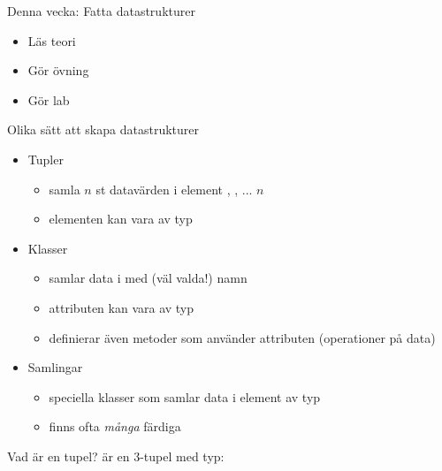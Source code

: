 
\ifkompendium\else

\begin{Slide}{Denna vecka: Fatta datastrukturer}
\begin{itemize}
\item Läs teori
\item Gör övning 
\item Gör lab 
\end{itemize}
\end{Slide}

\fi


\begin{Slide}{Olika sätt att skapa datastrukturer}
\begin{itemize}
\item Tupler
  \begin{itemize}
  \item samla $n$ st datavärden i element , , ...  \code{_}$n$
  \item elementen kan vara av  typ
  \end{itemize}
\item Klasser   
  \begin{itemize}
  \item samlar data i  med (väl valda!) namn
  \item attributen kan vara av  typ
  \item definierar även metoder som använder attributen (operationer på data)
  \end{itemize}

\item Samlingar 
  \begin{itemize}
  \item speciella klasser som samlar data i element av  typ
  \item finns ofta \emph{många} färdiga  
  \end{itemize}
\end{itemize}
\end{Slide}

\ifkompendium\else

\begin{Slide}{Vad är en tupel?}
 är en 3-tupel med typ: 
\end{Slide}

